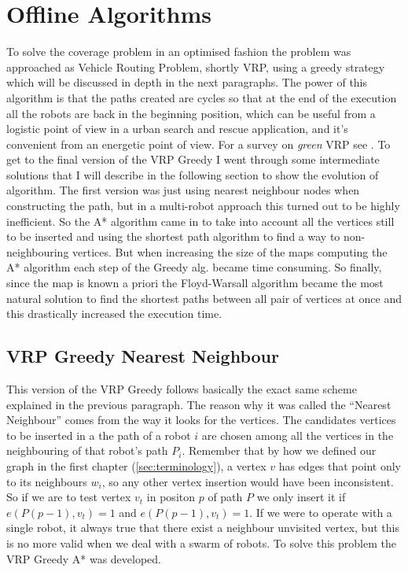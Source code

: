 \chapter{Offline Algorithms}

To solve the coverage problem in an optimised fashion the problem was approached as Vehicle Routing Problem, shortly VRP, using a greedy strategy which will be discussed in depth in the next paragraphs. 
The power of this algorithm is that the paths created are cycles so that at the end of the execution all the robots are back in the beginning position, which can be useful from a logistic point of view in a urban search and rescue application, and it's convenient from an energetic point of view. For a survey on \textit{green} VRP see \cite{greenVRP}. To get to the final version of the VRP Greedy I went through some intermediate solutions that I will describe in the following section to show the evolution of algorithm. The first version was just using nearest neighbour nodes when constructing the path, but in a multi-robot approach this turned out to be highly inefficient. So the A* algorithm came in to take into account all the vertices still to be inserted and using the shortest path algorithm to find a way to non-neighbouring vertices. But when increasing the size of the maps computing the A* algorithm each step of the Greedy alg. became time consuming. So finally, since the map is known a priori the Floyd-Warsall algorithm became the most natural solution to find the shortest paths between all pair of vertices at once and this drastically increased the execution time.





\section{VRP Greedy Nearest Neighbour}

This version of the VRP Greedy follows basically the exact same scheme explained in the previous paragraph. The reason why it was called the ``Nearest Neighbour'' comes from the way it looks for the vertices. The candidates vertices to be inserted in a the path of a robot $i$ are chosen among all the vertices in the neighbouring of that robot's path $P_i$. Remember that by how we defined our graph in the first chapter (\ref{sec:terminology}), a vertex $v$ has edges that point only to its neighbours $w_i$, so any other vertex insertion would have been inconsistent. So if we are to test vertex $v_t$ in positon $p$ of path $P$ we only insert it if $e(P(p-1),v_t)=1$ and $e(P(p-1),v_t)=1$.
If we were to operate with a single robot, it always true that there exist a neighbour unvisited vertex, but this is no more valid when we deal with a swarm of robots. To solve this problem the VRP Greedy A* was developed.


